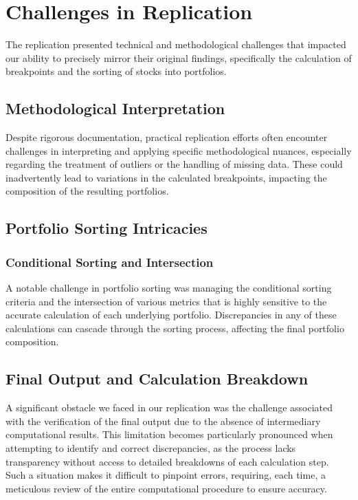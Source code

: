 \documentclass{article}
\begin{document}
\section*{Challenges in Replication}

The replication presented technical and methodological challenges that impacted our ability to precisely mirror their original findings, specifically the calculation of breakpoints and the sorting of stocks into portfolios.

\subsection*{Methodological Interpretation}

Despite rigorous documentation, practical replication efforts often encounter challenges in interpreting and applying specific methodological nuances, especially regarding the treatment of outliers or the handling of missing data. These could inadvertently lead to variations in the calculated breakpoints, impacting the composition of the resulting portfolios.

\subsection*{Portfolio Sorting Intricacies}

\subsubsection*{Conditional Sorting and Intersection}

A notable challenge in portfolio sorting was managing the conditional sorting criteria and the intersection of various metrics that is highly sensitive to the accurate calculation of each underlying portfolio. Discrepancies in any of these calculations can cascade through the sorting process, affecting the final portfolio composition.

\subsection*{Final Output and Calculation Breakdown}

A significant obstacle we faced in our replication was the challenge associated with the verification of the final output due to the absence of intermediary computational results. This limitation becomes particularly pronounced when attempting to identify and correct discrepancies, as the process lacks transparency without access to detailed breakdowns of each calculation step. Such a situation makes it difficult to pinpoint errors, requiring, each time, a meticulous review of the entire computational procedure to ensure accuracy.
\end{document}
